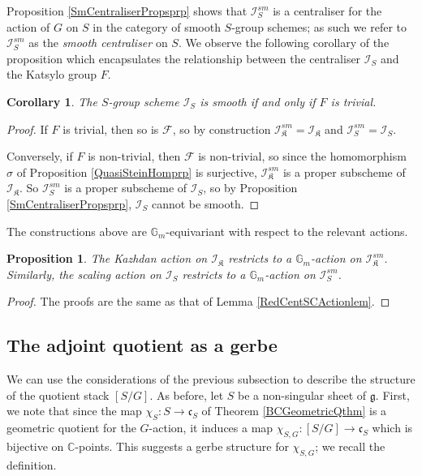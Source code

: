 \documentclass{amsart}
\newtheorem{proposition}[theorem]{Proposition}
\newtheorem{corollary}[theorem]{Corollary}
\theoremstyle{remark}
\numberwithin{theorem}{section}
\numberwithin{equation}{section}
\begin{document}
Proposition \ref{SmCentraliserPropsprp} shows that $\mathcal I_S^{sm}$ is a centraliser for the action of $G$ on $S$ in the category of smooth $S$-group schemes; as such we refer to $\mathcal I_S^{sm}$ as the \emph{smooth centraliser} on $S$. We observe the following corollary of the proposition which encapsulates the relationship between the centraliser $\mathcal I_S$ and the Katsylo group $F$.

\begin{corollary}\label{CentraliserKatsylocor}
    The $S$-group scheme $\mathcal I_S$ is smooth if and only if $F$ is trivial.
\end{corollary}

\begin{proof} 
If $F$ is trivial, then so is $\mathcal F$, so by construction $\mathcal I_{\mathfrak{K}}^{sm} =\mathcal I_{\mathfrak{K}}$ and $\mathcal I_S^{sm}=\mathcal I_S$. 

Conversely, if $F$ is non-trivial, then $\mathcal F$ is non-trivial, so since the homomorphism $\sigma$ of Proposition \ref{QuasiSteinHomprp} is surjective, $\mathcal I_\mathfrak{K}^{sm}$ is a proper subscheme of $\mathcal I_{\mathfrak{K}}$. So $\mathcal I_S^{sm}$ is a proper subscheme of $\mathcal I_S$, so by Proposition \ref{SmCentraliserPropsprp}, $\mathcal I_S$ cannot be smooth.
\end{proof}

The constructions above are $\mathbb{G}_m$-equivariant with respect to the relevant actions.

\begin{proposition}\label{SmCentGmEquivprp}
    The Kazhdan action on $\mathcal I_{\mathfrak{K}}$ restricts to a $\mathbb{G}_m$-action on $\mathcal I_{\mathfrak{K}}^{sm}$. Similarly, the scaling action on $\mathcal I_S$ restricts to a $\mathbb{G}_m$-action on $\mathcal I_S^{sm}$.
\end{proposition}
\begin{proof}
The proofs are the same as that of Lemma \ref{RedCentSCActionlem}.
\end{proof}

\subsection{The adjoint quotient as a gerbe}\label{AdjointQGerbesbn}

We can use the considerations of the previous subsection to describe the structure of the quotient stack $[S/G]$. As before, let $S$ be a non-singular sheet of $\mathfrak{g}$. First, we note that since the map $\chi_S:S \rightarrow \mathfrak{c}_S$ of Theorem \ref{BCGeometricQthm} is a geometric quotient for the $G$-action, it induces a map $\chi_{S,G}:[S/G] \rightarrow \mathfrak{c}_S$ which is bijective on $\mathbb{C}$-points. This suggests a gerbe structure for $\chi_{S,G}$; we recall the definition.
\end{document}
